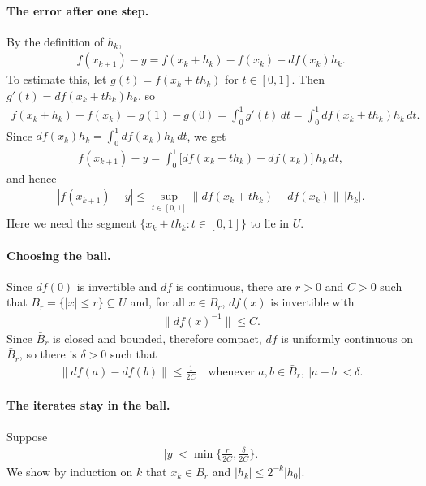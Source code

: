 \paragraph{The error after one step.} By the definition of $h_k$,
\begin{align}
    f(x_{k+1})-y= f(x_k+h_k)-f(x_k)-df(x_k)h_k.
\end{align}
To estimate this, let $g(t)=f(x_k+th_k)$ for $t\in[0,1]$. Then $g'(t)=df(x_k+th_k)h_k$, so
\begin{align}
    f(x_k+h_k)-f(x_k)=g(1)-g(0)=\int_0^1 g'(t)\,dt=\int_0^1 df(x_k+th_k)h_k\,dt.
\end{align}
Since $df(x_k)h_k=\int_0^1 df(x_k)h_k\,dt$, we get
\begin{align}
    f(x_{k+1})-y=\int_0^1\big[   df(x_k+th_k)-df(x_k)\big]\,h_k\,dt,
\end{align}
and hence
\begin{align}
    |f(x_{k+1})-y|\le \sup_{t\in[0,1]}\big\| df(x_k+th_k)-df(x_k) \big\|\,|h_k|.
\end{align}
Here we need the segment $\{x_k+th_k: t\in[0,1]\}$ to lie in $U$.

\paragraph{Choosing the ball.} Since $df(0)$ is invertible and $df$ is continuous,
there are $r>0$ and $C>0$ such that $\bar B_r=\{|x|\le r\}\subseteq U$ and,
for all $x\in\bar B_r$, $df(x)$ is invertible with
\begin{align}
    \|df(x)^{-1}\|\le C.
\end{align}
Since $\bar B_r$ is closed and bounded, therefore compact, $df$ is uniformly continuous on $\bar B_r$,
so there is $\delta>0$ such that
\begin{align}
    \|df(a)-df(b)\|\le \frac{1}{2C} \quad\text{whenever } a,b\in\bar B_r,\ |a-b|<\delta.
\end{align}
\paragraph{The iterates stay in the ball.} Suppose
\begin{align}
    |y| < \min\Big\{\frac{r}{2C},\frac{\delta}{2C}\Big\}.
\end{align}
We show by induction on $k$ that $x_k\in\bar B_r$ and $|h_k|\le 2^{-k}|h_0|$. 

